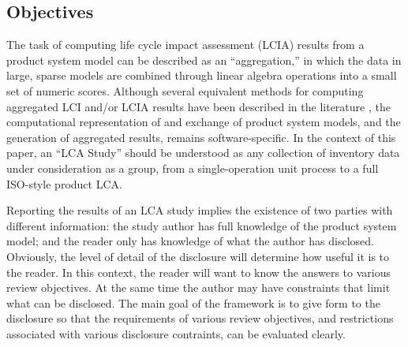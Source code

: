\subsection{Objectives}

The task of computing life cycle impact assessment (LCIA) results from a product system model can be described as an ``aggregation,'' in which the data in large, sparse models are combined through linear algebra operations into a small set of numeric scores.  Although several equivalent methods for computing aggregated LCI and/or LCIA results have been described in the literature \citep{Suh2005a, Peters_JLCA_2007}, the computational representation of and exchange of product system models, and the generation of aggregated results, remains software-specific.  
In the context of this paper, an ``LCA Study'' should be understood as any collection of inventory data under consideration as a group, from a single-operation unit process to a full ISO-style product LCA.

Reporting the results of an LCA study implies the existence of two parties with different information: the study author has full knowledge of the product system model; and the reader only has knowledge of what the author has disclosed.  Obviously, the level of detail of the disclosure will determine how useful it is to the reader.  In this context, the reader will want to know the answers to various review objectives.  
At the same time the author may have constraints that limit what can be disclosed.  The main goal of the framework is to give form to the disclosure so that the requirements of various review objectives, and restrictions associated with various disclosure contraints, can be evaluated clearly.

